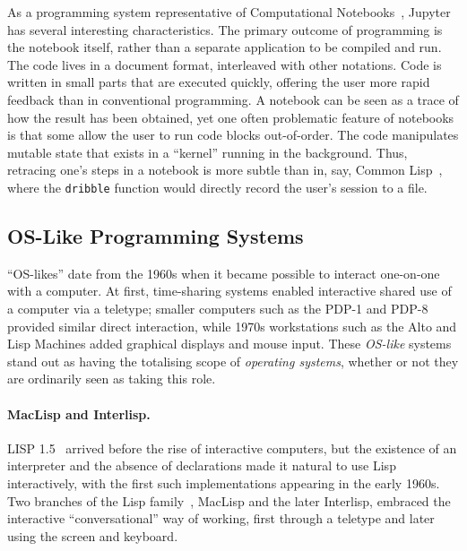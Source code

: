 \documentclass[ twoside,openright,titlepage,numbers=noenddot,headinclude,footinclude,cleardoublepage=empty,abstract=on,
                BCOR=5mm,paper=a4,fontsize=11pt
                ]{scrreprt}
\theoremstyle{definition}
\begin{document}
As a programming system representative of Computational
Notebooks~\parencite{CompNotebooks}, Jupyter has several interesting
characteristics. The primary outcome of programming is the notebook
itself, rather than a separate application to be compiled and run. The
code lives in a document format, interleaved with other notations. Code
is written in small parts that are executed quickly, offering the user
more rapid feedback than in conventional programming. A notebook can be
seen as a trace of how the result has been obtained, yet one often
problematic feature of notebooks is that some allow the user to run code
blocks out-of-order. The code manipulates mutable state that exists in a
``kernel'' running in the background. Thus, retracing one's steps in a
notebook is more subtle than in, say, Common
Lisp~\parencite{CommonLisp}, where the \texttt{dribble} function would
directly record the user's session to a file.

\hypertarget{os-like-programming-systems}{\subsection{OS-Like Programming
Systems}\label{os-like-programming-systems}}

``\ac{OS}-likes'' date from the 1960s when it became possible to
interact one-on-one with a computer. At first, time-sharing systems
enabled interactive shared use of a computer via a teletype; smaller
computers such as the PDP-1 and PDP-8 provided similar direct
interaction, while 1970s workstations such as the Alto and Lisp Machines
added graphical displays and mouse input. These \emph{\ac{OS}-like}
systems stand out as having the totalising scope of \emph{operating
systems}, whether or not they are ordinarily seen as taking this role.

\paragraph{MacLisp and Interlisp.}

LISP 1.5~\parencite{LISP15} arrived before the rise of interactive
computers, but the existence of an interpreter and the absence of
declarations made it natural to use Lisp interactively, with the first
such implementations appearing in the early 1960s. Two branches of the
Lisp family~\parencite{LispEvolve}, MacLisp and the later Interlisp,
embraced the interactive ``conversational'' way of working, first
through a teletype and later using the screen and keyboard.
\end{document}
